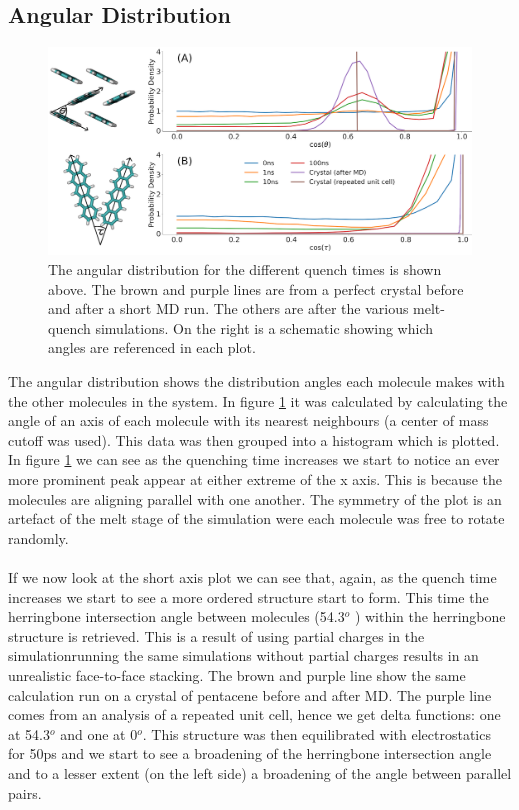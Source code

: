 \subsection{Angular Distribution}
\label{sect:ang_dist}
\begin{figure}[ht]
	\includegraphics[width=\textwidth]{../img/DifferentQuenchTimes/AngularDist.png}
	\caption{\label{fig:ang_dist}
	\noindent The angular distribution for the  different quench times is shown above. The brown and purple lines are from a perfect crystal before and after a short MD run. The others are after the various melt-quench simulations. On the right is a schematic showing which angles are referenced in each plot.}
\end{figure}
\noindent The angular distribution shows the distribution angles each molecule makes with the other molecules in the system. In figure \ref{fig:ang_dist} it was calculated by calculating the angle of an axis of each molecule with its nearest neighbours (a  center of mass cutoff was used). This data was then grouped into a histogram which is plotted.
In figure \ref{fig:ang_dist} we can see as the quenching time increases we start to notice an ever more prominent peak appear at either extreme of the x axis. This is because the molecules are aligning parallel with one another. The symmetry of the plot is an artefact of the melt stage of the simulation were each molecule was free to rotate randomly.
\\\\
If we now look at the short axis plot we can see that, again, as the quench time increases we start to see a more ordered structure start to form. This time the herringbone intersection angle between molecules (54.3$^{o}$ \cite{PentaceneAngle}) within the herringbone structure is retrieved. This is a result of using partial charges in the simulation\replace{- }{: }running the same simulations without partial charges results in an unrealistic face-to-face stacking. The brown and purple line show the same calculation run on a crystal of pentacene before and after MD. The purple line comes from an analysis of a repeated unit cell, hence we get  delta functions: one at 54.3$^{o}$ and one at 0$^{o}$. This structure was then equilibrated with electrostatics for 50ps and we start to see a broadening of the herringbone intersection angle and to a lesser extent (on the left side) a broadening of the angle between parallel pairs.

